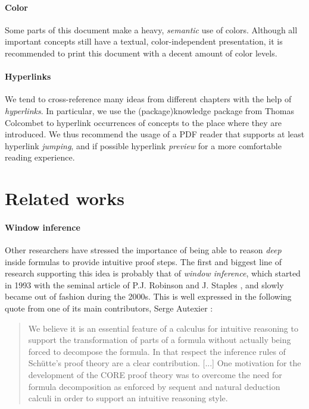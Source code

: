 \paragraph{Color}

Some parts of this document make a heavy, \emph{semantic} use of colors.
Although all important concepts still have a textual, color-independent
presentation, it is recommended to print this document with a decent amount of
color levels.

\paragraph{Hyperlinks}
  
We tend to cross-reference many ideas from different chapters with the help of
\emph{hyperlinks}. In particular, we use the \kl(package){knowledge} package
from Thomas Colcombet to hyperlink occurrences of concepts to the place where
they are introduced. We thus recommend the usage of a PDF reader that supports
at least hyperlink \emph{jumping}, and if possible hyperlink \emph{preview} for
a more comfortable reading experience.


\section{Related works}

\paragraph{Window inference}

Other researchers have stressed the importance of being able to reason
\emph{deep} inside formulas to provide intuitive proof steps. The first and
biggest line of research supporting this idea is probably that of \emph{window
inference}, which started in 1993 with the seminal article of P.J. Robinson and
J. Staples , and slowly became out of
fashion during the 2000s. This is well expressed in the following quote from one
of its main contributors, Serge Autexier :

\begin{quote}
We believe it is an essential feature of a calculus for intuitive reasoning to
support the transformation of parts of a formula without actually being forced
to decompose the formula. In that respect the inference rules of Schütte's proof
theory are a clear contribution. [...] One motivation for the development of the
CORE proof theory was to overcome the need for formula decomposition as enforced
by sequent and natural deduction calculi in order to support an intuitive
reasoning style.
\end{quote}

